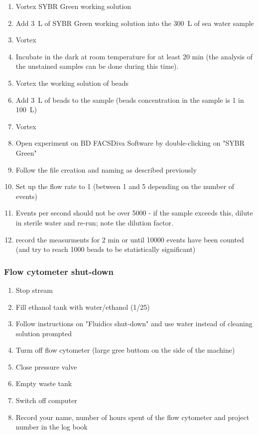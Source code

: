 \begin{enumerate}
\item Vortex SYBR Green working solution
\item Add 3~\textmu L of SYBR Green working solution into the 300~\textmu L of sea water sample
\item Vortex
\item Incubate in the dark at room temperature for at least 20 min (the analysis of the unstained samples can be done during this time).
\item Vortex the working solution of beads
\item Add 3~\textmu L of beads to the sample (beads concentration in the sample is 1 in 100~\textmu L)
\item Vortex 
\item Open experiment on BD FACSDiva Software by double-clicking on "SYBR Green"
\item Follow the file creation and naming as described previously
\item Set up the flow rate to 1 (between 1 and 5 depending on the number of events)
\item Events per second should not be over 5000 - if the sample exceeds this, dilute in sterile water and re-run; note the dilution factor.
\item record the measurments for 2 min or until 10000 events have been counted (and try to reach 1000 beads to be statistically significant)
\end{enumerate}

\subsubsection{Flow cytometer shut-down}

\begin{enumerate}
\item Stop stream
\item Fill ethanol tank with water/ethanol (1/25)
\item Follow instructions on "Fluidics shut-down" and use water instead of cleaning solution prompted
\item Turm off flow cytometer (large gree buttom on the side of the machine)
\item Close pressure valve
\item Empty waste tank
\item Switch off computer
\item Record your name, number of hours spent of the flow cytometer and project number in the log book
\end{enumerate}